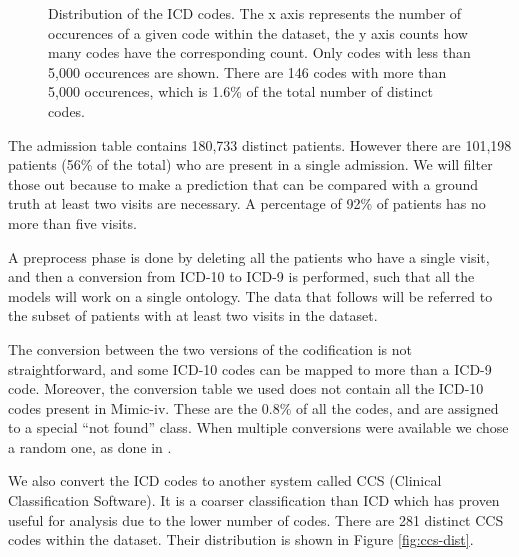 \documentclass[]{marticle}
\begin{document}
\begin{figure}[!tb] 
\caption{
    Distribution of the ICD codes. The x axis represents the number of occurences of a given code
    within the dataset, the y axis counts how many codes have the corresponding count. Only codes
    with less than 5,000 occurences are shown. There are 146 codes with more than 5,000 occurences,
    which is 1.6\% of the total number of distinct codes.
} 
\label{fig:icd-dist} 
\end{figure}


The admission table contains 180,733 distinct patients. However there are 101,198 patients (56\% of
the total) who are present in a single admission. We will filter those out because to make a
prediction that can be compared with a ground truth at least two visits are necessary. A percentage
of 92\% of patients has no more than five visits.

A preprocess phase is done by deleting all the patients who have a single visit, and then a
conversion from ICD-10 to ICD-9 is performed, such that all the models will work on a single
ontology. The data that follows will be referred to the subset of patients with at least two visits
in the dataset.

The conversion between the two versions of the codification is not straightforward, and some ICD-10
codes can be mapped to more than a ICD-9 code. Moreover, the conversion table we used 
does not contain all the ICD-10 codes present in Mimic-iv. These are the 0.8\% of all the codes, and
are assigned to a special ``not found'' class. When multiple conversions were available we chose a
random one, as done in \cite{setor-paper}.

We also convert the ICD codes to another system called CCS (Clinical Classification Software).
It is a coarser classification than ICD which has proven useful for analysis due to the lower number
of codes. There are 281 distinct CCS codes within the dataset. Their distribution is shown in Figure
\ref{fig:ccs-dist}.
\end{document}

